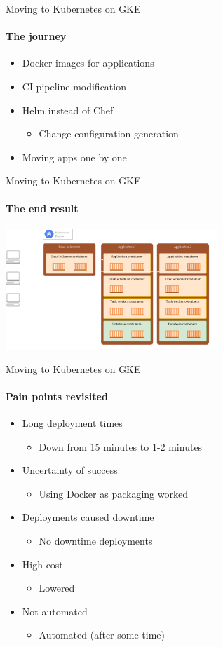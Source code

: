 \documentclass[17pt]{beamer}
\begin{document}
  \begin{frame}{Moving to Kubernetes on GKE}
  \framesubtitle{The journey}
  \begin{itemize}
    \item<1-> Docker images for applications
    \item<2-> CI pipeline modification
    \item<3-> Helm instead of Chef
    \begin{itemize}
      \item Change configuration generation
    \end{itemize}
    \bigskip
    \item<4-> Moving apps one by one
  \end{itemize}
  \end{frame}

  \begin{frame}{Moving to Kubernetes on GKE}
  \framesubtitle{The end result}
  \centering
  \includegraphics[width=8cm]{images/kubernetes_diagram.png}
  \end{frame}

  \begin{frame}{Moving to Kubernetes on GKE}
  \framesubtitle{Pain points revisited}
  \begin{itemize}
    \item<1-> Long deployment times
    \begin{itemize}
      \item Down from 15 minutes to 1-2 minutes
    \end{itemize}
    \item<2-> Uncertainty of success
    \begin{itemize}
      \item Using Docker as packaging worked
    \end{itemize}
    \item<3-> Deployments caused downtime
    \begin{itemize}
      \item No downtime deployments
    \end{itemize}
    \item<4-> High cost
    \begin{itemize}
      \item Lowered
    \end{itemize}
    \item<5-> Not automated
    \begin{itemize}
      \item Automated (after some time)
    \end{itemize}
  \end{itemize}
  \end{frame}
\end{document}

